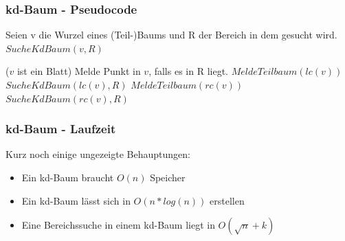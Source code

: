 \begin{frame}
	\frametitle{kd-Baum - Pseudocode}
	Seien v die Wurzel eines (Teil-)Baums und R der Bereich in dem gesucht wird.\\
	$SucheKdBaum(v, R)$
	\begin{algorithmic}
	\If ($v$ ist ein Blatt)
		\State Melde Punkt in $v$, falls es in R liegt.
	\Else
		\pause
		{
			\State $MeldeTeilbaum(lc(v))$
			\pause
		\Else
				\State $SucheKdBaum(lc(v),R)$				
			\EndIf
		\EndIf
		\pause
			\State $MeldeTeilbaum(rc(v))$
		\Else
				\State $SucheKdBaum(rc(v),R)$				
			\EndIf
		\EndIf}
	\EndIf
	\end{algorithmic}
\end{frame}

\begin{frame}
	\frametitle{kd-Baum - Laufzeit}
	Kurz noch einige ungezeigte Behauptungen:
	\begin{itemize}
		\item Ein kd-Baum braucht $O(n)$ Speicher
		\item Ein kd-Baum lässt sich in $O(n*log(n))$ erstellen
		\item Eine Bereichssuche in einem kd-Baum liegt in $O(\sqrt{n}+k)$
	\end{itemize}
\end{frame}